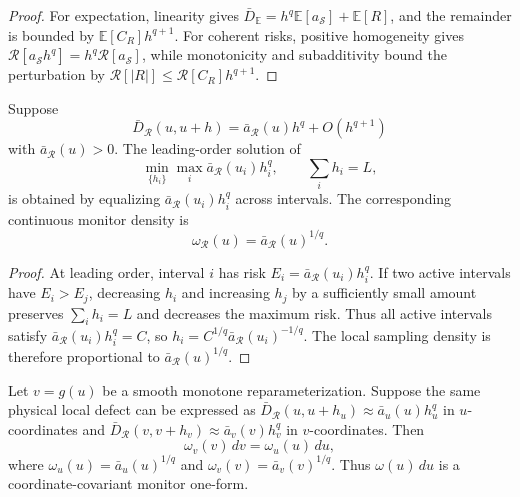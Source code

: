 \begin{proof}
For expectation, linearity gives
$\bar D_{\mathbb E}=h^q\mathbb E[a_{\mathcal S}]+\mathbb E[R]$, and the
remainder is bounded by $\mathbb E[C_R]h^{q+1}$. For coherent risks, positive
homogeneity gives $\mathcal R[a_{\mathcal S}h^q]=h^q\mathcal R[a_{\mathcal S}]$,
while monotonicity and subadditivity bound the perturbation by
$\mathcal R[|R|]\le\mathcal R[C_R]h^{q+1}$.
\end{proof}

\begin{theorem}
\label{thm:correct-monitor}
Suppose
\begin{equation}
  \bar D_{\mathcal R}(u,u+h)
  =
  \bar a_{\mathcal R}(u)h^q+O(h^{q+1})
\end{equation}
with $\bar a_{\mathcal R}(u)>0$. The leading-order solution of
\begin{equation}
  \min_{\{h_i\}}\max_i \bar a_{\mathcal R}(u_i)h_i^q,
  \qquad \sum_i h_i=L,
\end{equation}
is obtained by equalizing $\bar a_{\mathcal R}(u_i)h_i^q$ across intervals.
The corresponding continuous monitor density is
\begin{equation}
  \omega_{\mathcal R}(u)=\bar a_{\mathcal R}(u)^{1/q}.
\end{equation}
\end{theorem}

\begin{proof}
At leading order, interval $i$ has risk
$E_i=\bar a_{\mathcal R}(u_i)h_i^q$. If two active intervals have
$E_i>E_j$, decreasing $h_i$ and increasing $h_j$ by a sufficiently small amount
preserves $\sum_i h_i=L$ and decreases the maximum risk. Thus all active
intervals satisfy $\bar a_{\mathcal R}(u_i)h_i^q=C$, so
$h_i=C^{1/q}\bar a_{\mathcal R}(u_i)^{-1/q}$. The local sampling density is
therefore proportional to $\bar a_{\mathcal R}(u)^{1/q}$.
\end{proof}

\begin{theorem}
\label{thm:coordinate-covariance}
Let $v=g(u)$ be a smooth monotone reparameterization. Suppose the same physical
local defect can be expressed as
$\bar D_{\mathcal R}(u,u+h_u)\approx\bar a_u(u)h_u^q$ in $u$-coordinates and
$\bar D_{\mathcal R}(v,v+h_v)\approx\bar a_v(v)h_v^q$ in $v$-coordinates.
Then
\begin{equation}
  \omega_v(v)\,dv=\omega_u(u)\,du,
\end{equation}
where $\omega_u(u)=\bar a_u(u)^{1/q}$ and
$\omega_v(v)=\bar a_v(v)^{1/q}$. Thus $\omega(u)\,du$ is a
coordinate-covariant monitor one-form.
\end{theorem}

